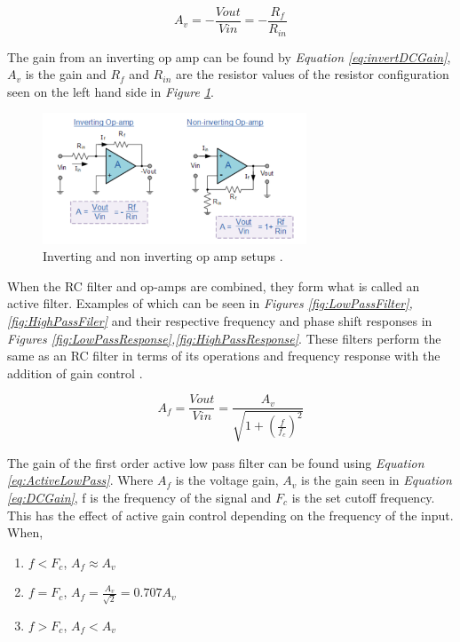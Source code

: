 \begin{equation}
    A_v = -\frac{V{out}}{V{in}} = -\frac{R_f}{R_{in}}
    \label{eq:invertDCGain}
\end{equation}

The gain from an inverting op amp can be found by \textit{Equation \ref{eq:invertDCGain}}, $A_v$ is the gain and $R_f$ and $R_{in}$ are the resistor values of the resistor configuration seen on the left hand side in \textit{Figure \ref{fig:invNonInvOPamp}}.

\begin{figure}[h]
    \centering
    \includegraphics[width=0.70\textwidth]{graphics/invNoninv.png}
    \caption{Inverting and non inverting op amp setups \cite{noauthor_operational_2013}.}
    \label{fig:invNonInvOPamp}
\end{figure}

When the RC filter and op-amps are combined, they form what is called an active filter.
Examples of which can be seen in \textit{Figures \ref{fig:LowPassFilter},\ref{fig:HighPassFiler}} and their respective frequency and phase shift responses in \textit{Figures \ref{fig:LowPassResponse},\ref{fig:HighPassResponse}}.
These filters perform the same as an RC filter in terms of its operations and frequency response with the addition of gain control \cite{noauthor_active_2013-1}.


\begin{equation}
    A_f = \frac{V{out}}{V{in}} = \frac{A_v}{\sqrt{1 + (\frac{f}{f_c})^2}}
    \label{eq:ActiveLowPass}
\end{equation}


The gain of the first order active low pass filter can be found using \textit{Equation \ref{eq:ActiveLowPass}}.
Where $A_f$ is the voltage gain, $A_v$ is the gain seen in \textit{Equation \ref{eq:DCGain}}, f is the frequency of the signal and $F_c$ is the set cutoff frequency.
This has the effect of active gain control depending on the frequency of the input.
When,
\begin{enumerate}
    \item $f < F_c$, $A_f \approx A_v$
    \item $f = F_c$, $A_f = \frac{A_v}{\sqrt{2}} = 0.707 A_v$
    \item$f > F_c$, $A_f < A_v$
\end{enumerate}

